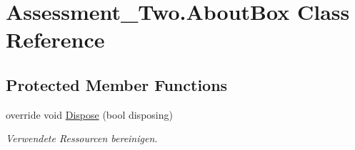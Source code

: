 \hypertarget{class_assessment___two_1_1_about_box}{
\section{Assessment\_\-Two.AboutBox Class Reference}
\label{class_assessment___two_1_1_about_box}
}
\subsection*{Protected Member Functions}
\begin{DoxyCompactItemize}
\item 
override void \hyperlink{class_assessment___two_1_1_about_box_abe2fa8ca1d62e22970fb6474714cc3fc}{Dispose} (bool disposing)
\begin{DoxyCompactList}\small\item\em Verwendete Ressourcen bereinigen. \item\end{DoxyCompactList}\end{DoxyCompactItemize}
